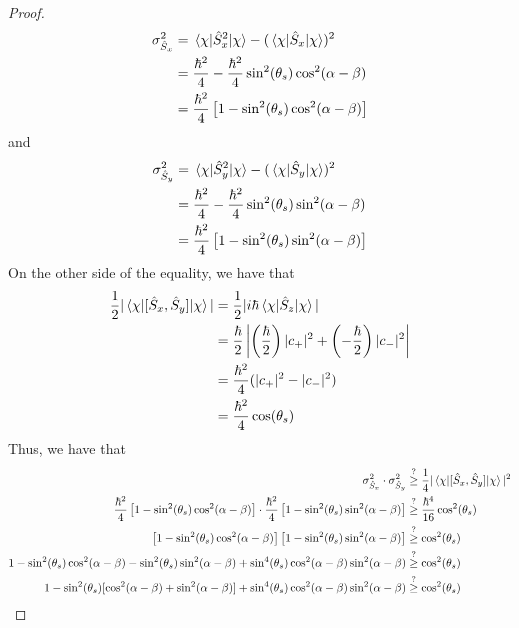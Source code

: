 \documentclass[../psets.tex]{subfiles}
\begin{document}
\begin{enumerate}
\begin{enumerate}
\begin{proof}
\begin{align*}
                \sigma_{\hat{S}_x}^2 &= \ev{\hat{S}_x^2}{\chi}-(\ev{\hat{S}_x}{\chi})^2\\
                &= \frac{\hbar^2}{4}-\frac{\hbar^2}{4}\sin^2(\theta_s)\cos^2(\alpha-\beta)\\
                &= \frac{\hbar^2}{4}\left[ 1-\sin^2(\theta_s)\cos^2(\alpha-\beta) \right]
            \end{align*}
            and
            \begin{align*}
                \sigma_{\hat{S}_y}^2 &= \ev{\hat{S}_y^2}{\chi}-(\ev{\hat{S}_y}{\chi})^2\\
                &= \frac{\hbar^2}{4}-\frac{\hbar^2}{4}\sin^2(\theta_s)\sin^2(\alpha-\beta)\\
                &= \frac{\hbar^2}{4}\left[ 1-\sin^2(\theta_s)\sin^2(\alpha-\beta) \right]
            \end{align*}
            On the other side of the equality, we have that
            \begin{align*}
                \frac{1}{2}|\ev{[\hat{S}_x,\hat{S}_y]}{\chi}| &= \frac{1}{2}|i\hbar\ev{\hat{S}_z}{\chi}|\\
                &= \frac{\hbar}{2}\left| \left( \frac{\hbar}{2} \right)|c_+|^2+\left( -\frac{\hbar}{2} \right)|c_-|^2 \right|\\
                &= \frac{\hbar^2}{4}(|c_+|^2-|c_-|^2)\\
                &= \frac{\hbar^2}{4}\cos(\theta_s)
            \end{align*}
            Thus, we have that
            \begin{align*}
                \sigma_{\hat{S}_x}^2\cdot\sigma_{\hat{S}_y}^2 &\stackrel{?}{\geq} \frac{1}{4}|\ev{[\hat{S}_x,\hat{S}_y]}{\chi}|^2\\
                \frac{\hbar^2}{4}\left[ 1-\sin^2(\theta_s)\cos^2(\alpha-\beta) \right]\cdot\frac{\hbar^2}{4}\left[ 1-\sin^2(\theta_s)\sin^2(\alpha-\beta) \right] &\stackrel{?}{\geq} \frac{\hbar^4}{16}\cos^2(\theta_s)\\
                \left[ 1-\sin^2(\theta_s)\cos^2(\alpha-\beta) \right]\left[ 1-\sin^2(\theta_s)\sin^2(\alpha-\beta) \right] &\stackrel{?}{\geq} \cos^2(\theta_s)\\
                1-\sin^2(\theta_s)\cos^2(\alpha-\beta)-\sin^2(\theta_s)\sin^2(\alpha-\beta)+\sin^4(\theta_s)\cos^2(\alpha-\beta)\sin^2(\alpha-\beta) &\stackrel{?}{\geq} \cos^2(\theta_s)\\
                1-\sin^2(\theta_s)[\cos^2(\alpha-\beta)+\sin^2(\alpha-\beta)]+\sin^4(\theta_s)\cos^2(\alpha-\beta)\sin^2(\alpha-\beta) &\stackrel{?}{\geq} \cos^2(\theta_s)\\

\end{align*}
\end{proof}
\end{enumerate}
\end{enumerate}
\end{document}
